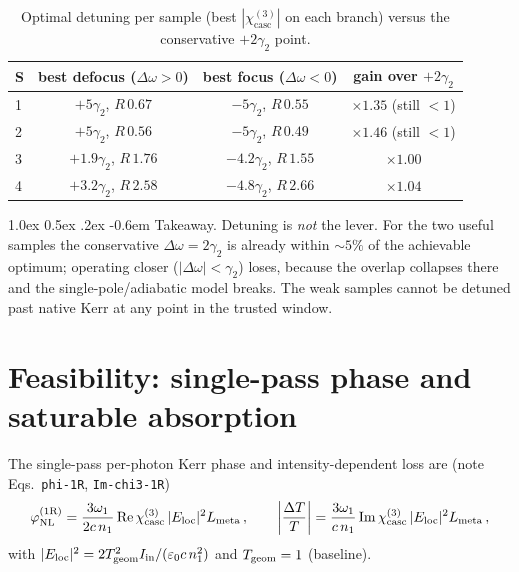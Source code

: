 \documentclass[11pt,a4paper]{article}
\makeatletter
\newcommand{\eps}{\varepsilon}
\newcommand{\chithree}{\chi^{(3)}}
\newcommand{\Dom}{\Delta\omega}
\newcommand{\chicasc}{\chithree_{\text{casc}}}
\newcommand{\Eloc}{E_{\text{loc}}}
\renewcommand\paragraph{%
  \@startsection{paragraph}{4}{\z@}%
                {1.0ex \@plus 0.5ex \@minus .2ex}%
                {-0.6em}%
                {\normalfont\itshape}}
\makeatother
\begin{document}
\begin{table}[H]
  \centering
  \caption{Optimal detuning per sample (best $|\chicasc|$ on each branch) versus
  the conservative $+2\gamma_2$ point.}
  \label{tab:optimal}
  \small
  \begin{tabular}{lccc}
    \toprule
    S & best defocus ($\Dom>0$) & best focus ($\Dom<0$) & gain over $+2\gamma_2$ \\
    \midrule
    1 & $+5\gamma_2$, $R\,0.67$   & $-5\gamma_2$, $R\,0.55$   & $\times1.35$ (still $<1$) \\
    2 & $+5\gamma_2$, $R\,0.56$   & $-5\gamma_2$, $R\,0.49$   & $\times1.46$ (still $<1$) \\
    3 & $+1.9\gamma_2$, $R\,1.76$ & $-4.2\gamma_2$, $R\,1.55$ & $\times1.00$ \\
    4 & $+3.2\gamma_2$, $R\,2.58$ & $-4.8\gamma_2$, $R\,2.66$ & $\times1.04$ \\
    \bottomrule
  \end{tabular}
\end{table}

\paragraph{Takeaway.}
Detuning is \emph{not} the lever. For the two useful samples the conservative
$\Dom=2\gamma_2$ is already within $\sim\!5\%$ of the achievable optimum; operating
closer ($|\Dom|<\gamma_2$) loses, because the overlap collapses there and the
single-pole/adiabatic model breaks. The weak samples cannot be detuned past native
Kerr at any point in the trusted window.

\section{Feasibility: single-pass phase and saturable absorption}
\label{sec:feasibility}

The single-pass per-photon Kerr phase and intensity-dependent loss are
(note Eqs.~\texttt{phi-1R}, \texttt{Im-chi3-1R})
\begin{equation}
  \varphi_{\rm NL}^{(1\mathrm R)} = \frac{3\omega_1}{2 c\,n_1}\,
        \mathrm{Re}\,\chicasc\,|\Eloc|^2 L_{\rm meta}\,,
  \qquad
  \left|\frac{\Delta T}{T}\right| = \frac{3\omega_1}{c\,n_1}\,
        \mathrm{Im}\,\chicasc\,|\Eloc|^2 L_{\rm meta}\,,
\end{equation}
with $|\Eloc|^2 = 2T_{\rm geom}^2 I_{\rm in}/(\eps_0 c\,n_1^2)$ and
$T_{\rm geom}=1$ (baseline).
\end{document}
